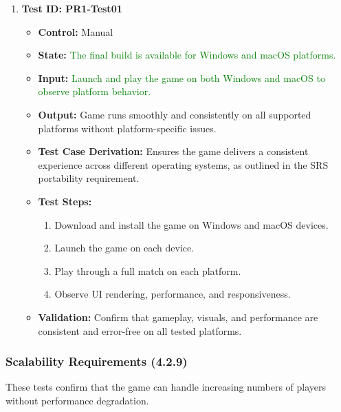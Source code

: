 \documentclass[12pt]{article}
\newcommand{\added}[1]{\textcolor{green}{#1}}
\begin{document}
\begin{enumerate}
    \item \textbf{Test ID: PR1-Test01}
    \begin{itemize}
        \item \textbf{Control:} Manual
        \item \textbf{State:} \added{The final build is available for Windows and macOS platforms.}
        \item \textbf{Input:} \added{Launch and play the game on both Windows and macOS to observe platform behavior.}
        \item \textbf{Output:} Game runs smoothly and consistently on all supported platforms without platform-specific issues.
        \item \textbf{Test Case Derivation:} Ensures the game delivers a consistent experience across different operating systems, as outlined in the SRS portability requirement.
        \item \textbf{Test Steps:}
        \begin{enumerate}
            \item Download and install the game on Windows and macOS devices.
            \item Launch the game on each device.
            \item Play through a full match on each platform.
            \item Observe UI rendering, performance, and responsiveness.
        \end{enumerate}
        \item \textbf{Validation:} Confirm that gameplay, visuals, and performance are consistent and error-free on all tested platforms.
    \end{itemize}
\end{enumerate}

\subsubsection{Scalability Requirements (4.2.9)}

These tests confirm that the game can handle increasing numbers of players without performance degradation.
\end{document}
